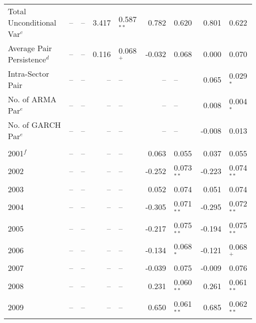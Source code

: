 \documentclass[12pt]{report}
\begin{document}
\begin{table}
\begin{tabular}{l r l r l r l r l}
        Total Unconditional Var$^{c}$      &     -- & --            &   3.417 & 0.587$^{**}$ &   0.782 & 0.620         &   0.801 & 0.622         \\
        Average Pair Persistence$^{d}$     &     -- & --            &   0.116 & 0.068$^{+}$  &  -0.032 & 0.068         &   0.000 & 0.070         \\
        Intra-Sector Pair                  &     -- & --            &      -- & --           &      -- & --            &   0.065 & 0.029$^{*}$   \\
        No. of ARMA Par$^{e}$              &     -- & --            &      -- & --           &      -- & --            &   0.008 & 0.004$^{*}$   \\
        No. of GARCH Par$^{e}$             &     -- & --            &      -- & --           &      -- & --            &  -0.008 & 0.013         \\  \\
        2001$^{f}$                         &     -- & --            &      -- & --           &   0.063 & 0.055         &   0.037 & 0.055         \\
        2002                               &     -- & --            &      -- & --           &  -0.252 & 0.073$^{**}$  &  -0.223 & 0.074$^{**}$  \\
        2003                               &     -- & --            &      -- & --           &   0.052 & 0.074         &   0.051 & 0.074         \\
        2004                               &     -- & --            &      -- & --           &  -0.305 & 0.071$^{**}$  &  -0.295 & 0.072$^{**}$  \\
        2005                               &     -- & --            &      -- & --           &  -0.217 & 0.075$^{**}$  &  -0.194 & 0.075$^{**}$  \\
        2006                               &     -- & --            &      -- & --           &  -0.134 & 0.068$^{*}$   &  -0.121 & 0.068$^{+}$   \\
        2007                               &     -- & --            &      -- & --           &  -0.039 & 0.075         &  -0.009 & 0.076         \\
        2008                               &     -- & --            &      -- & --           &   0.231 & 0.060$^{**}$  &   0.261 & 0.061$^{**}$  \\
        2009                               &     -- & --            &      -- & --           &   0.650 & 0.061$^{**}$  &   0.685 & 0.062$^{**}$  \\

\end{tabular}
\end{table}
\end{document}

